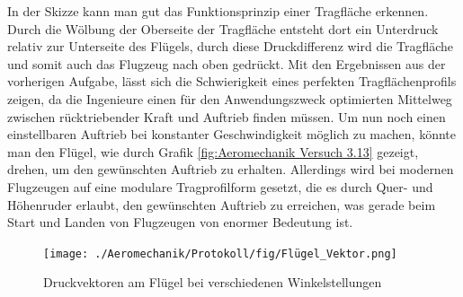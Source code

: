 In der Skizze kann man gut das Funktionsprinzip einer Tragfläche erkennen. Durch die Wölbung der Oberseite der Tragfläche entsteht dort ein Unterdruck relativ zur Unterseite des Flügels, durch diese Druckdifferenz wird die Tragfläche und somit auch das Flugzeug nach oben gedrückt. Mit den Ergebnissen aus der vorherigen Aufgabe, lässt sich die Schwierigkeit eines perfekten Tragflächenprofils zeigen, da die Ingenieure einen für den Anwendungszweck optimierten Mittelweg zwischen rücktriebender Kraft und Auftrieb finden müssen. Um nun noch einen einstellbaren Auftrieb bei konstanter Geschwindigkeit möglich zu machen, könnte man den Flügel, wie durch Grafik \ref{fig:Aeromechanik Versuch 3.13} gezeigt, drehen, um den gewünschten Auftrieb zu erhalten. Allerdings wird bei modernen Flugzeugen auf eine modulare Tragprofilform gesetzt, die es durch Quer- und Höhenruder erlaubt, den gewünschten Auftrieb zu erreichen, was gerade beim Start und Landen von Flugzeugen von enormer Bedeutung ist.

\begin{figure}[h!]
    \centering
    \texttt{[image: ./Aeromechanik/Protokoll/fig/Flügel\_Vektor.png]}
    \caption{Druckvektoren am Flügel bei verschiedenen Winkelstellungen}
    \label{fig:Venturi}
\end{figure}